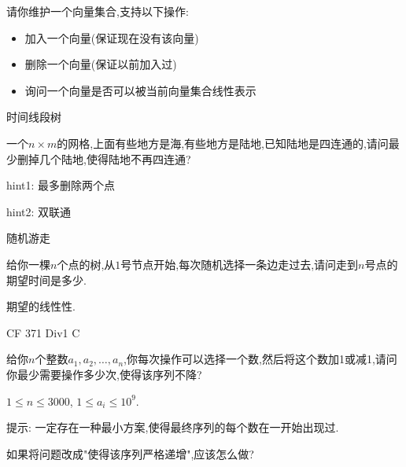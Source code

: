 \documentclass[11pt,serif]{beamer}
\begin{document}
	\begin{frame}
		\begin{problem}
			请你维护一个向量集合,支持以下操作:
			\begin{itemize}
				\item 加入一个向量(保证现在没有该向量)
				\item 删除一个向量(保证以前加入过)
				\item 询问一个向量是否可以被当前向量集合线性表示
			\end{itemize}
		\end{problem} 
		
		\pause
		
		\begin{solution}
			时间线段树
		\end{solution} 
	\end{frame}

	\begin{frame}
		\begin{problem}
			一个$n\times m$的网格,上面有些地方是海,有些地方是陆地,已知陆地是四连通的,请问最少删掉几个陆地,使得陆地不再四连通?
		\end{problem}
		
		\pause
		
		\begin{solution}
			hint1: 最多删除两个点
			
			\pause
			
			hint2: 双联通
		\end{solution} 
	 
	\end{frame}

	\begin{frame}{随机游走}
		\begin{problem}
			给你一棵$n$个点的树,从$1$号节点开始,每次随机选择一条边走过去,请问走到$n$号点的期望时间是多少.
		\end{problem}
	
	
		\pause
		
		\begin{solution}
			期望的线性性.
		\end{solution} 
		 
	\end{frame}



	\begin{frame}{CF 371 Div1 C}
		\begin{problem}
			给你$n$个整数$a_1,a_2,\dots,a_n$,你每次操作可以选择一个数,然后将这个数加1或减1,请问你最少需要操作多少次,使得该序列不降?
			
			$1 \leq n \leq 3000$, $1 \leq a_i \leq 10^9$.
			
			\pause
			
			提示: 一定存在一种最小方案,使得最终序列的每个数在一开始出现过.
			
			\pause
			
			如果将问题改成"使得该序列严格递增",应该怎么做?
		\end{problem}
	\end{frame}

	
	
\end{document}
